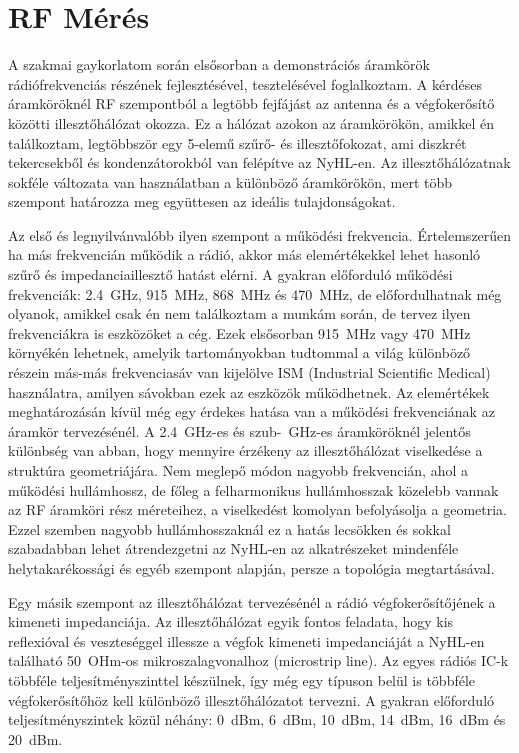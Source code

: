 \documentclass[a4paper,12pt,titlepage]{article}
\begin{document}
    \section{RF Mérés}
        A szakmai gaykorlatom során elsősorban a demonstrációs áramkörök rádiófrekvenciás részének fejlesztésével, tesztelésével foglalkoztam. A kérdéses áramköröknél RF szempontból a legtöbb fejfájást az antenna és a végfokerősítő közötti illesztőhálózat okozza. Ez a hálózat azokon az áramkörökön, amikkel én találkoztam, legtöbbször egy 5-elemű szűrő- és illesztőfokozat, ami diszkrét tekercsekből és kondenzátorokból van felépítve az NyHL-en. Az illesztőhálózatnak sokféle változata van használatban a különböző áramkörökön, mert több szempont határozza meg együttesen az ideális tulajdonságokat.
        \par
        Az első és legnyilvánvalóbb ilyen szempont a működési frekvencia. Értelemszerűen ha más frekvencián működik a rádió, akkor más elemértékekkel lehet hasonló szűrő és impedanciaillesztő hatást elérni. A gyakran előforduló működési frekvenciák: \SI{2,4}{GHz}, \SI{915}{MHz}, \SI{868}{MHz} és \SI{470}{MHz}, de előfordulhatnak még olyanok, amikkel csak én nem találkoztam a munkám során, de tervez ilyen frekvenciákra is eszközöket a cég. Ezek elsősorban \SI{915}{MHz} vagy \SI{470}{MHz} környékén lehetnek, amelyik tartományokban tudtommal a világ különböző részein más-más frekvenciasáv van kijelölve ISM (Industrial Scientific Medical) használatra, amilyen sávokban ezek az eszközök működhetnek. Az elemértékek meghatározásán kívül még egy érdekes hatása van a működési frekvenciának az áramkör tervezésénél. A \SI{2,4}{GHz}-es és szub-\SI{}{GHz}-es áramköröknél jelentős különbség van abban, hogy mennyire érzékeny az illesztőhálózat viselkedése a struktúra geometriájára. Nem meglepő módon nagyobb frekvencián, ahol a működési hullámhossz, de főleg a felharmonikus hullámhosszak közelebb vannak az RF áramköri rész méreteihez, a viselkedést komolyan befolyásolja a geometria. Ezzel szemben nagyobb hullámhosszaknál ez a hatás lecsökken és sokkal szabadabban lehet átrendezgetni az NyHL-en az alkatrészeket mindenféle helytakarékossági és egyéb szempont alapján, persze a topológia megtartásával.
        \par
        Egy másik szempont az illesztőhálózat tervezésénél a rádió végfokerősítőjének a kimeneti impedanciája. Az illesztőhálózat egyik fontos feladata, hogy kis reflexióval és veszteséggel illessze a végfok kimeneti impedanciáját a NyHL-en található \SI{50}{OHm}-os mikroszalagvonalhoz (microstrip line). Az egyes rádiós IC-k többféle teljesítményszinttel készülnek, így még egy típuson belül is többféle végfokerősítőhöz kell különböző illesztőhálózatot tervezni. A gyakran előforduló teljesítményszintek közül néhány: \SI{0}{dBm}, \SI{6}{dBm}, \SI{10}{dBm}, \SI{14}{dBm}, \SI{16}{dBm} és \SI{20}{dBm}.
\end{document}
